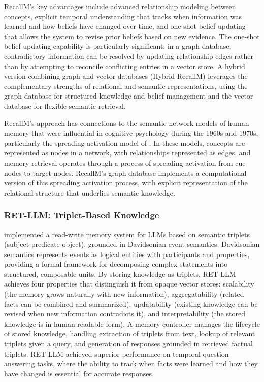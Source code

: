 \documentclass[11pt,letterpaper]{article}
\begin{document}
RecallM's key advantages include advanced relationship modeling between concepts, explicit temporal understanding that tracks when information was learned and how beliefs have changed over time, and one-shot belief updating that allows the system to revise prior beliefs based on new evidence. The one-shot belief updating capability is particularly significant: in a graph database, contradictory information can be resolved by updating relationship edges rather than by attempting to reconcile conflicting entries in a vector store. A hybrid version combining graph and vector databases (Hybrid-RecallM) leverages the complementary strengths of relational and semantic representations, using the graph database for structured knowledge and belief management and the vector database for flexible semantic retrieval.

RecallM's approach has connections to the semantic network models of human memory that were influential in cognitive psychology during the 1960s and 1970s, particularly the spreading activation model of \cite{collins1975spreading}. In these models, concepts are represented as nodes in a network, with relationships represented as edges, and memory retrieval operates through a process of spreading activation from cue nodes to target nodes. RecallM's graph database implements a computational version of this spreading activation process, with explicit representation of the relational structure that underlies semantic knowledge.

\subsubsection{RET-LLM: Triplet-Based Knowledge}

\cite{modarressi2024retllm} implemented a read-write memory system for LLMs based on semantic triplets (subject-predicate-object), grounded in Davidsonian event semantics. Davidsonian semantics represents events as logical entities with participants and properties, providing a formal framework for decomposing complex statements into structured, composable units. By storing knowledge as triplets, RET-LLM achieves four properties that distinguish it from opaque vector stores: scalability (the memory grows naturally with new information), aggregatability (related facts can be combined and summarized), updatability (existing knowledge can be revised when new information contradicts it), and interpretability (the stored knowledge is in human-readable form). A memory controller manages the lifecycle of stored knowledge, handling extraction of triplets from text, lookup of relevant triplets given a query, and generation of responses grounded in retrieved factual triplets. RET-LLM achieved superior performance on temporal question answering tasks, where the ability to track when facts were learned and how they have changed is essential for accurate responses.
\end{document}
